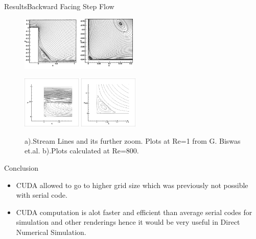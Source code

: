 \documentclass[11pt]{beamer}
\begin{document}
\begin{frame}{Results}{Backward Facing Step Flow}
\begin{figure}[hH]
\includegraphics[width=0.5\textwidth]{figures/sir/re1vertex}

\includegraphics[width=0.25\textwidth]{figures/cuda/psizoom1}
\includegraphics[width=0.25\textwidth]{figures/cuda/psizoom2}
\caption{a).Stream Lines and its further zoom. Plots at Re=1 from G. Biswas et.al. b).Plots calculated at Re=800.}
\end{figure}
\end{frame}


\begin{frame}{Conclusion}
\begin{itemize}
\item CUDA  allowed to go to higher grid size which was previously not possible with serial code. 
\item  CUDA computation is alot faster and efficient than average serial codes for simulation and other renderings hence it would be very useful in Direct Numerical Simulation.

\end{itemize}

\end{frame}
\end{document}
